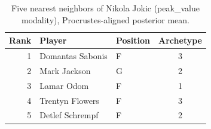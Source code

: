 \begin{table}[htbp]
  \centering\small
  \begin{tabular}{rllc}
    \toprule
    Rank & Player & Position & Archetype \\
    \midrule
    1 & Domantas Sabonis & F & 3 \\
    2 & Mark Jackson & G & 2 \\
    3 & Lamar Odom & F & 1 \\
    4 & Trentyn Flowers & F & 3 \\
    5 & Detlef Schrempf & F & 2 \\
    \bottomrule
  \end{tabular}
  \caption{Five nearest neighbors of Nikola Jokic (peak_value modality), Procrustes-aligned posterior mean.}
  \label{tab:Nikola_Jokic_neighbors_peak_value}
\end{table}

